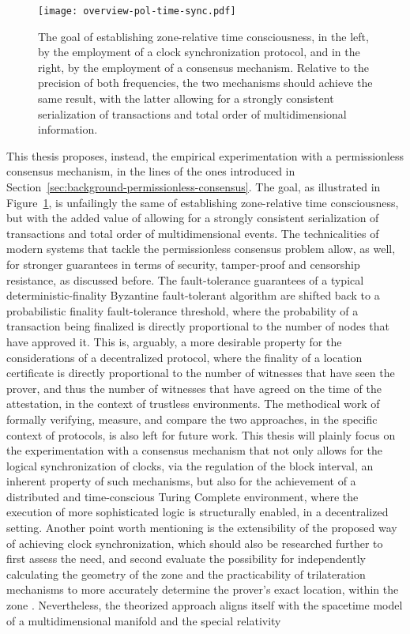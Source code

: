 \begin{figure}[ht]
    \begin{center}
    \texttt{[image: overview-pol-time-sync.pdf]}
    \caption{The goal of establishing zone-relative time consciousness, in the left, by the employment of a clock synchronization protocol, and in the right, by the employment of a consensus mechanism. Relative to the precision of both frequencies, the two mechanisms should achieve the same result, with the latter allowing for a strongly consistent serialization of transactions and total order of multidimensional information.}
    \label{fig:proof-of-location-overview-time-sync}
    \end{center}
\end{figure}

This thesis proposes, instead, the empirical experimentation with a permissionless consensus mechanism, in the lines of the ones introduced in Section~\ref{sec:background-permissionless-consensus}. The goal, as illustrated in Figure~\ref{fig:proof-of-location-overview-time-sync}, is unfailingly the same of establishing zone-relative time consciousness, but with the added value of allowing for a strongly consistent serialization of transactions and total order of multidimensional events. The technicalities of modern systems that tackle the permissionless consensus problem allow, as well, for stronger guarantees in terms of security, tamper-proof and censorship resistance, as discussed before. The fault-tolerance guarantees of a typical deterministic-finality Byzantine fault-tolerant algorithm are shifted back to a probabilistic finality fault-tolerance threshold, where the probability of a transaction being finalized is directly proportional to the number of nodes that have approved it. This is, arguably, a more desirable property for the considerations of a decentralized \pol{} protocol, where the finality of a location certificate is directly proportional to the number of witnesses that have seen the prover, and thus the number of witnesses that have agreed on the time of the attestation, in the context of trustless environments. The methodical work of formally verifying, measure, and compare the two approaches, in the specific context of \pol{} protocols, is also left for future work. This thesis will plainly focus on the experimentation with a consensus mechanism that not only allows for the logical synchronization of clocks, via the regulation of the block interval, an inherent property of such mechanisms, but also for the achievement of a distributed and time-conscious Turing Complete environment, where the execution of more sophisticated logic is structurally enabled, in a decentralized setting. Another point worth mentioning is the extensibility of the proposed way of achieving clock synchronization, which should also be researched further to first assess the need, and second evaluate the possibility for independently calculating the geometry of the zone and the practicability of trilateration mechanisms to more accurately determine the prover's exact location, within the zone \cite{foam-white-paper}. Nevertheless, the theorized approach aligns itself with the spacetime model of a multidimensional manifold and the special relativity 